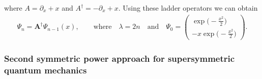 \documentclass[pdftex]{sigma}%
\numberwithin{equation}{section}
\begin{document}
where $A= \partial_x + x$ and $A^\dag = -\partial_x + x$. Using these ladder operators we can obtain
\begin{gather*}
\Psi_n=\mathbf{A}^\dagger \Psi_{n-1}(x), \qquad \textrm{where} \quad
\lambda=2n \quad \textrm{and} \quad \Psi_0=\begin{pmatrix}\exp\bigl(-\frac{x^2}{2}\bigr)\\[1mm] -x\exp\bigl(-\frac{x^2}{2}\bigr)\end{pmatrix}\!.
\end{gather*}


\subsubsection{Second symmetric power approach for supersymmetric quantum mechanics}
\end{document}
